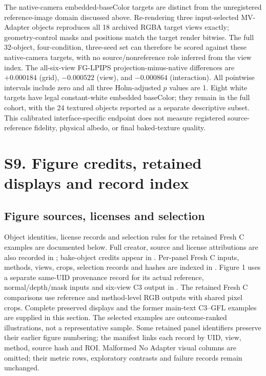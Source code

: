 \documentclass[11pt]{article}
\begin{document}
The native-camera embedded-baseColor targets are distinct from the unregistered
reference-image domain discussed above. Re-rendering three input-selected
MV-Adapter objects reproduces all 18 archived RGBA target views exactly;
geometry-control masks and positions match the target render bitwise.
The full 32-object, four-condition, three-seed set can therefore be scored
against these native-camera targets, with no source/nonreference role inferred
from the view index. The all-six-view FG-LPIPS projection-minus-native
differences are $+0.000184$ (grid), $-0.000522$ (view), and $-0.000864$
(interaction). All pointwise intervals include zero and all three Holm-adjusted
$p$ values are 1. Eight white targets have legal constant-white embedded
baseColor; they remain in the full cohort, with the 24 textured objects reported
as a separate descriptive subset. This calibrated interface-specific endpoint
does not measure registered source-reference fidelity, physical albedo, or
final baked-texture quality.

\FloatBarrier
\section*{S9. Figure credits, retained displays and record index}
\label{supp:group9}

\subsection*{Figure sources, licenses and selection}
Object identities, license records and selection rules for the retained Fresh C examples are documented below. Full creator, source and license attributions are also recorded in ; bake-object credits appear in . Per-panel Fresh C inputs, methods, views, crops, selection records and hashes are indexed in . Figure 1 uses a separate same-UID provenance record for its actual reference, normal/depth/mask inputs and six-view C3 output in .
The retained Fresh C comparisons use reference and method-level RGB outputs with shared pixel crops. Complete preserved displays and the former main-text C3--GFL examples are supplied in this section. The selected examples are outcome-ranked illustrations, not a representative sample. Some retained panel identifiers preserve their earlier figure numbering; the manifest links each record by UID, view, method, source hash and ROI. Malformed No Adapter visual columns are omitted; their metric rows, exploratory contrasts and failure records remain unchanged.
\end{document}
